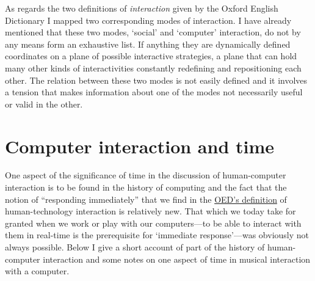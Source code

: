 \label{sec:inter-defin:par7}
As regards the two definitions of \emph{interaction} given by the Oxford English Dictionary I mapped two corresponding modes of interaction. I have already mentioned that these two modes, `social' and `computer' interaction, do not by any means form an exhaustive list. If anything they are dynamically defined coordinates on a plane of possible interactive strategies, a plane that can hold many other kinds of interactivities constantly redefining and repositioning each other. The relation between these two modes is not easily defined and it involves a tension that makes information about one of the modes not necessarily useful or valid in the other.





\section{Computer interaction and time}
\label{sec:interaction-time}

One aspect of the significance of time in the discussion of human-computer interaction is to be found in the history of computing and the fact that the notion of ``responding immediately'' that we find in the \hyperref[interaction:item:2]{OED's definition} of human-technology interaction is relatively new. That which we today take for granted when we work or play with our computers---to be able to interact with them in real-time is the prerequisite for `immediate response'---was obviously not always possible. Below I give a short account of part of the history of human-computer interaction and some notes on one aspect of time in musical interaction with a computer.

